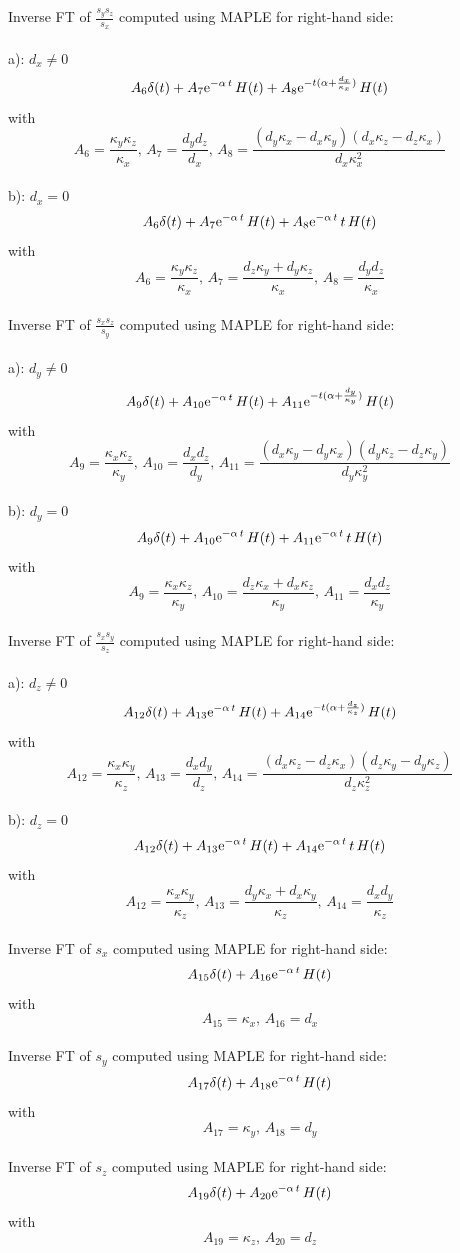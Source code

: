 \documentclass[onecolumn,extra]{gji_modified_cours_UPPA}
\begin{document}
\noindent
Inverse FT of $\frac{s_y s_z}{s_x}$ computed using MAPLE for right-hand side:\\\\
a): $d_x \neq 0 $
$$A_6\delta(t) + A_7 {\rm e}^{-\alpha\,t} \, H(t) + A_8 {\rm e}^{-t(\alpha+\frac{d_x}{\kappa_x})} \, H(t) $$
with
$$A_6=\frac{\kappa_y \kappa_z}{\kappa_x},\,A_7=\frac{d_y d_z}{d_x},
\,A_8=\frac{(d_y \kappa_x - d_x \kappa_y )(d_x \kappa_z - d_z \kappa_x )}{d_x \kappa^{2}_x}$$\\
b): $d_x = 0 $
$$A_6\delta(t) + A_7 {\rm e}^{-\alpha\,t} \, H(t) + A_8 {\rm e}^{-\alpha\,t} \, t \, H(t) $$
with
$$A_6=\frac{\kappa_y \kappa_z}{\kappa_x},\,A_7=\frac{d_z \kappa_y + d_y \kappa_z}{\kappa_x},\,
A_8=\frac{d_y d_z}{\kappa_x}
$$
\\
\noindent
Inverse FT of $\frac{s_x s_z}{s_y}$ computed using MAPLE for right-hand side:\\\\
a): $d_y \neq 0 $
$$A_9\delta(t) + A_{10} {\rm e}^{-\alpha\,t} \, H(t) + A_{11} {\rm e}^{-t(\alpha+\frac{d_y}{\kappa_y})} \, H(t) $$
with
$$A_9=\frac{\kappa_x \kappa_z}{\kappa_y},\,A_{10}=\frac{d_x d_z}{d_y},
\,A_{11}=\frac{(d_x \kappa_y - d_y \kappa_x )(d_y \kappa_z - d_z \kappa_y )}{d_y \kappa^{2}_y}$$\\
b): $d_y = 0 $
$$A_9\delta(t) + A_{10} {\rm e}^{-\alpha\,t} \, H(t) + A_{11} {\rm e}^{-\alpha\,t} \, t \, H(t) $$
with
$$A_9=\frac{\kappa_x \kappa_z}{\kappa_y},\,A_{10}=\frac{d_z \kappa_x + d_x \kappa_z}{\kappa_y},\,
A_{11}=\frac{d_x d_z}{\kappa_y}
$$
\\
\noindent
Inverse FT of $\frac{s_x s_y}{s_z}$ computed using MAPLE for right-hand side:\\\\
a): $d_z \neq 0 $
$$A_{12}\delta(t) + A_{13} {\rm e}^{-\alpha\,t} \, H(t) + A_{14} {\rm e}^{-t(\alpha+\frac{d_z}{\kappa_z})} \, H(t) $$
with
$$A_{12}=\frac{\kappa_x \kappa_y}{\kappa_z},\,A_{13}=\frac{d_x d_y}{d_z},
\,A_{14}=\frac{(d_x \kappa_z - d_z \kappa_x )(d_z \kappa_y - d_y \kappa_z )}{d_z \kappa^{2}_z}$$\\
b): $d_z = 0 $
$$A_{12}\delta(t) + A_{13} {\rm e}^{-\alpha\,t} \, H(t) + A_{14} {\rm e}^{-\alpha\,t} \, t \, H(t) $$
with
$$A_{12}=\frac{\kappa_x \kappa_y}{\kappa_z},\,A_{13}=\frac{d_y \kappa_x + d_x \kappa_y}{\kappa_z},\,
A_{14}=\frac{d_x d_y}{\kappa_z}
$$
\\
\noindent
Inverse FT of $s_x$ computed using MAPLE for right-hand side:
$$A_{15}\delta(t) + A_{16} {\rm e}^{-\alpha\,t} \, H(t) $$
with
$$A_{15}= \kappa_x, \, A_{16}=d_x $$
\\
\noindent
Inverse FT of $s_y$ computed using MAPLE for right-hand side:
$$A_{17}\delta(t) + A_{18} {\rm e}^{-\alpha\,t} \, H(t) $$
with
$$A_{17}= \kappa_y, \, A_{18}=d_y $$
\\
\noindent
Inverse FT of $s_z$ computed using MAPLE for right-hand side:
$$A_{19}\delta(t) + A_{20} {\rm e}^{-\alpha\,t} \, H(t) $$
with
$$A_{19}= \kappa_z, \, A_{20}=d_z $$
\end{document}
